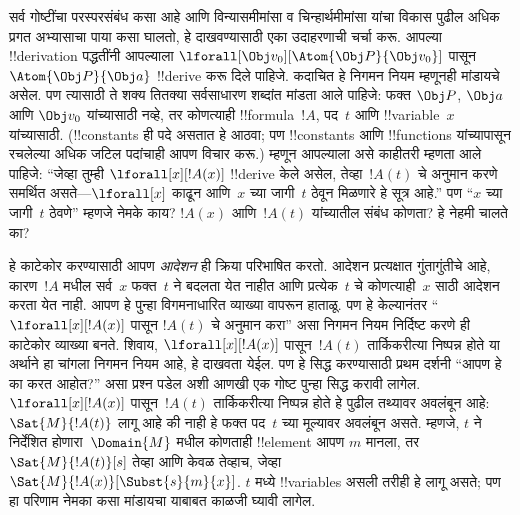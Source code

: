 \documentclass[../../../include/open-logic-section]{subfiles}
\begin{document}


सर्व गोष्टींचा परस्परसंबंध कसा आहे आणि विन्यासमीमांसा व
चिन्हार्थमीमांसा यांचा विकास पुढील अधिक प्रगत अभ्यासाचा पाया कसा घालतो,
हे दाखवण्यासाठी एका उदाहरणाची चर्चा करू. आपल्या !!{derivation} पद्धतींनी
आपल्याला $\lforall[\Obj v_0][\Atom{\Obj P}{\Obj v_0}]$ पासून
$\Atom{\Obj P}{\Obj a}$ !!{derive} करू दिले पाहिजे. कदाचित हे निगमन नियम
म्हणूनही मांडायचे असेल. पण त्यासाठी ते शक्य तितक्या सर्वसाधारण शब्दांत
मांडता आले पाहिजे: फक्त $\Obj P$, $\Obj a$ आणि $\Obj v_0$ यांच्यासाठी
नव्हे, तर कोणत्याही !!{formula}~$!A$, पद~$t$ आणि !!{variable}~$x$
यांच्यासाठी. (!!{constant}s ही पदे असतात हे आठवा; पण !!{constant}s आणि
!!{function}s यांच्यापासून रचलेल्या अधिक जटिल पदांचाही आपण विचार करू.)
म्हणून आपल्याला असे काहीतरी म्हणता आले पाहिजे: ``जेव्हा तुम्ही
$\lforall[x][!A(x)]$ !!{derive} केले असेल, तेव्हा~$!A(t)$ चे अनुमान
करणे समर्थित असते---$\lforall[x]$ काढून आणि~$x$ च्या जागी~$t$ ठेवून
मिळणारे हे सूत्र आहे.'' पण ``$x$ च्या जागी~$t$ ठेवणे'' म्हणजे नेमके
काय? $!A(x)$ आणि~$!A(t)$ यांच्यातील संबंध कोणता? हे नेहमी चालते का?

हे काटेकोर करण्यासाठी आपण \emph{आदेशन} ही क्रिया परिभाषित करतो.
आदेशन प्रत्यक्षात गुंतागुंतीचे आहे, कारण~$!A$ मधील सर्व~$x$ फक्त~$t$ ने
बदलता येत नाहीत आणि प्रत्येक~$t$ चे कोणत्याही~$x$ साठी आदेशन करता येत
नाही. आपण हे पुन्हा विगमनाधारित व्याख्या वापरून हाताळू. पण हे
केल्यानंतर ``$\lforall[x][!A(x)]$ पासून $!A(t)$ चे अनुमान करा'' असा
निगमन नियम निर्दिष्ट करणे ही काटेकोर व्याख्या बनते. शिवाय,
$\lforall[x][!A(x)]$ पासून~$!A(t)$ तार्किकरीत्या निष्पन्न होते या अर्थाने
हा चांगला निगमन नियम आहे, हे दाखवता येईल. पण हे सिद्ध करण्यासाठी प्रथम
दर्शनी ``आपण हे का करत आहोत?'' असा प्रश्न पडेल अशी आणखी एक गोष्ट पुन्हा
सिद्ध करावी लागेल. $\lforall[x][!A(x)]$ पासून~$!A(t)$ तार्किकरीत्या
निष्पन्न होते हे पुढील तथ्यावर अवलंबून आहे: $\Sat{M}{!A(t)}$ लागू आहे
की नाही हे फक्त पद~$t$ च्या मूल्यावर अवलंबून असते. म्हणजे, $t$ ने
निर्देशित होणारा~$\Domain{M}$ मधील कोणताही !!{element} आपण $m$ मानला,
तर $\Sat{M}{!A(t)}[s]$ तेव्हा आणि केवळ तेव्हाच, जेव्हा
$\Sat{M}{!A(x)}[\Subst{s}{m}{x}]$. $t$ मध्ये !!{variable}s असली तरीही
हे लागू असते; पण हा परिणाम नेमका कसा मांडायचा याबाबत काळजी घ्यावी
लागेल.
\end{document}
